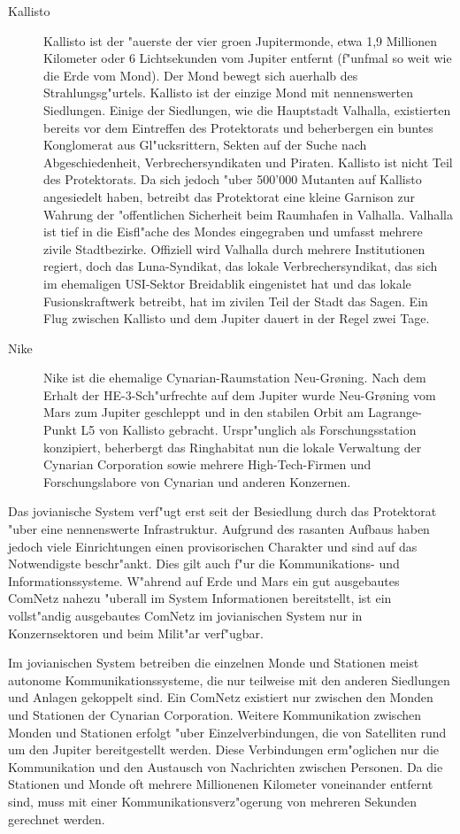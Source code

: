 \begin{description}
\item [Kallisto] Kallisto ist der "au\3erste der vier gro\3en Jupitermonde, etwa 1,9 Millionen Kilometer oder 6 Lichtsekunden vom Jupiter 
      entfernt (f"unfmal so weit wie die Erde vom Mond). Der Mond bewegt sich au\3erhalb des Strahlungsg"urtels. Kallisto ist der einzige Mond mit nennenswerten Siedlungen. Einige der Siedlungen, wie die Hauptstadt Valhalla, existierten bereits vor dem Eintreffen des Protektorats und beherbergen ein buntes Konglomerat aus Gl"ucksrittern, Sekten auf der Suche nach Abgeschiedenheit, Verbrechersyndikaten und Piraten. Kallisto ist nicht Teil des Protektorats. Da sich jedoch "uber 500'000 Mutanten auf Kallisto angesiedelt haben, betreibt das Protektorat eine kleine Garnison zur Wahrung der "offentlichen Sicherheit beim Raumhafen in Valhalla. Valhalla ist tief in die Eisfl"ache des Mondes eingegraben und umfasst mehrere zivile Stadtbezirke. Offiziell wird Valhalla durch mehrere Institutionen regiert, doch das Luna-Syndikat, das lokale Verbrechersyndikat, das sich im ehemaligen USI-Sektor Breidablik eingenistet hat und das lokale Fusionskraftwerk betreibt, hat im zivilen Teil der Stadt das Sagen. Ein Flug zwischen Kallisto und dem Jupiter dauert in der Regel zwei Tage.
\item [Nike]  Nike ist die ehemalige Cynarian-Raumstation Neu-Gr{\o}ning. Nach dem Erhalt der HE-3-Sch"urfrechte auf dem 
      Jupiter wurde Neu-Gr{\o}ning vom Mars zum Jupiter geschleppt und in den stabilen Orbit am Lagrange-Punkt L5 von Kallisto gebracht. Urspr"unglich als Forschungsstation konzipiert, beherbergt das Ringhabitat nun die lokale Verwaltung der Cynarian Corporation sowie mehrere High-Tech-Firmen und Forschungslabore von Cynarian und anderen Konzernen.
\end{description}


Das jovianische System verf"ugt erst seit der Besiedlung durch das Protektorat "uber eine nennenswerte Infrastruktur. Aufgrund des rasanten Aufbaus haben jedoch viele Einrichtungen einen provisorischen Charakter und sind auf das Notwendigste beschr"ankt. Dies gilt auch f"ur die Kommunikations- und Informationssysteme. W"ahrend auf Erde und Mars ein gut ausgebautes ComNetz nahezu "uberall im System Informationen bereitstellt, ist ein vollst"andig ausgebautes ComNetz im jovianischen System nur in Konzernsektoren und beim Milit"ar verf"ugbar.

Im jovianischen System betreiben die einzelnen Monde und Stationen meist autonome Kommunikationssysteme, die nur teilweise mit den anderen Siedlungen und Anlagen gekoppelt sind. Ein ComNetz existiert nur zwischen den Monden und Stationen der Cynarian Corporation. Weitere Kommunikation zwischen Monden und Stationen erfolgt "uber Einzelverbindungen, die von Satelliten rund um den Jupiter bereitgestellt werden. Diese Verbindungen erm"oglichen nur die Kommunikation und den Austausch von Nachrichten zwischen Personen. Da die Stationen und Monde oft mehrere Millionenen Kilometer voneinander entfernt sind, muss mit einer Kommunikationsverz"ogerung von mehreren Sekunden gerechnet werden.

